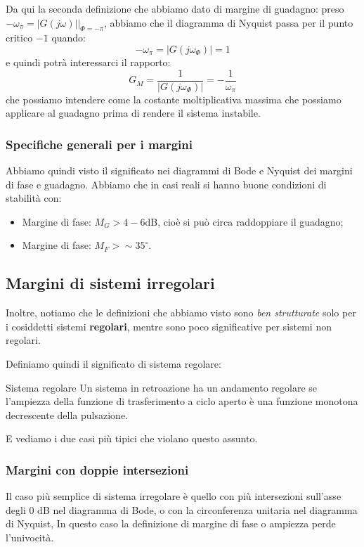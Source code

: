 \documentclass[a4paper,11pt]{article}
\begin{document}
Da qui la seconda definizione che abbiamo dato di margine di guadagno: preso $-\omega_\pi = |G(j \omega)| \big|_{\Phi = -\pi}$, abbiamo che il diagramma di Nyquist passa per il punto critico $-1$ quando:
$$
-\omega_\pi = |G(j\omega_\Phi)| = 1 
$$
e quindi potrà interessarci il rapporto:
$$
G_M = \frac{1}{|G(j\omega_\Phi)|} = -\frac{1}{\omega_\pi}
$$
che possiamo intendere come la costante moltiplicativa massima che possiamo applicare al guadagno prima di rendere il sistema instabile.

\subsubsection{Specifiche generali per i margini}

Abbiamo quindi visto il significato nei diagrammi di Bode e Nyquist dei margini di fase e guadagno.
Abbiamo che in casi reali si hanno buone condizioni di stabilità con:
\begin{itemize}
	\item Margine di fase: $M_G > 4 - 6 \mathrm{dB}$, cioè si può circa raddoppiare il guadagno;
	\item Margine di fase: $M_F > \sim 35^\circ$.
\end{itemize}

\subsection{Margini di sistemi irregolari}
Inoltre, notiamo che le definizioni che abbiamo visto sono \textit{ben strutturate} solo per i cosiddetti sistemi \textbf{regolari}, mentre sono poco significative per sistemi non regolari.

Definiamo quindi il significato di sistema regolare:
\begin{definition}{Sistema regolare}
	Un sistema in retroazione ha un andamento regolare se l'ampiezza della funzione di trasferimento a ciclo aperto è una funzione monotona decrescente della pulsazione.
\end{definition}

E vediamo i due casi più tipici che violano questo assunto.

\subsubsection{Margini con doppie intersezioni}
Il caso più semplice di sistema irregolare è quello con più intersezioni sull'asse degli 0 dB nel diagramma di Bode, o con la circonferenza unitaria nel diagramma di Nyquist, 
In questo caso la definizione di margine di fase o ampiezza perde l'univocità.
\end{document}
